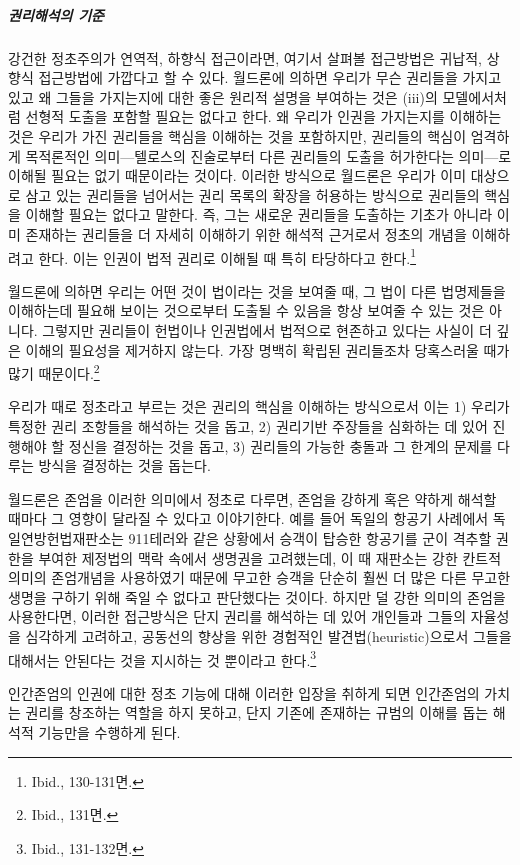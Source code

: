 \subparagraph{권리해석의 기준}

강건한 정초주의가 연역적, 하향식 접근이라면, 여기서 살펴볼 접근방법은 귀납적, 상향식 접근방법에 가깝다고 할 수 있다. 월드론에 의하면 우리가 무슨 권리들을 가지고 있고 왜 그들을 가지는지에 대한 좋은 원리적 설명을 부여하는 것은 (iii)의 모델에서처럼 선형적 도출을 포함할 필요는 없다고 한다. 왜 우리가 인권을 가지는지를 이해하는 것은 우리가 가진 권리들을 핵심을 이해하는 것을 포함하지만, 권리들의 핵심이 엄격하게 목적론적인 의미---텔로스의 진술로부터 다른 권리들의 도출을 허가한다는 의미---로 이해될 필요는 없기 때문이라는 것이다. 이러한 방식으로 월드론은 우리가 이미 대상으로 삼고 있는 권리들을 넘어서는 권리 목록의 확장을 허용하는 방식으로 권리들의 핵심을 이해할 필요는 없다고 말한다. 즉, 그는 새로운 권리들을 도출하는 기초가 아니라 이미 존재하는 권리들을 더 자세히 이해하기 위한 해석적 근거로서 정초의 개념을 이해하려고 한다. 이는 인권이 법적 권리로 이해될 때 특히 타당하다고 한다.\footnote{Ibid., 130-131면.}

월드론에 의하면 우리는 어떤 것이 법이라는 것을 보여줄 때, 그 법이 다른 법명제들을 이해하는데 필요해 보이는 것으로부터 도출될 수 있음을 항상 보여줄 수 있는 것은 아니다. 그렇지만 권리들이 헌법이나 인권법에서 법적으로 현존하고 있다는 사실이 더 깊은 이해의 필요성을 제거하지 않는다. 가장 명백히 확립된 권리들조차 당혹스러울 때가 많기 때문이다.\footnote{Ibid., 131면.}

우리가 때로 정초라고 부르는 것은 권리의 핵심을 이해하는 방식으로서 이는 1) 우리가 특정한 권리 조항들을 해석하는 것을 돕고, 2) 권리기반 주장들을 심화하는 데 있어 진행해야 할 정신을 결정하는 것을 돕고, 3) 권리들의 가능한 충돌과 그 한계의 문제를 다루는 방식을 결정하는 것을 돕는다.

월드론은 존엄을 이러한 의미에서 정초로 다루면, 존엄을 강하게 혹은 약하게 해석할 때마다 그 영향이 달라질 수 있다고 이야기한다. 예를 들어 독일의 항공기 사례에서 독일연방헌법재판소는 911테러와 같은 상황에서 승객이 탑승한 항공기를 군이 격추할 권한을 부여한 제정법의 맥락 속에서 생명권을 고려했는데, 이 때 재판소는 강한 칸트적 의미의 존엄개념을 사용하였기 때문에 무고한 승객을 단순히 훨씬 더 많은 다른 무고한 생명을 구하기 위해 죽일 수 없다고 판단했다는 것이다. 하지만 덜 강한 의미의 존엄을 사용한다면, 이러한 접근방식은 단지 권리를 해석하는 데 있어 개인들과 그들의 자율성을 심각하게 고려하고, 공동선의 향상을 위한 경험적인 발견법(heuristic)으로서 그들을 대해서는 안된다는 것을 지시하는 것 뿐이라고 한다.\footnote{Ibid., 131-132면.}

인간존엄의 인권에 대한 정초 기능에 대해 이러한 입장을 취하게 되면 인간존엄의 가치는 권리를 창조하는 역할을 하지 못하고, 단지 기존에 존재하는 규범의 이해를 돕는 해석적 기능만을 수행하게 된다.

